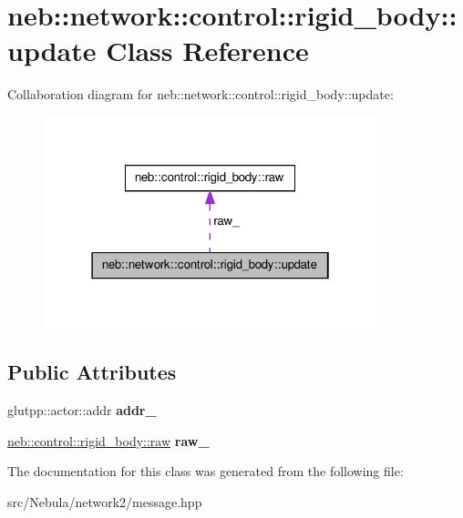 \hypertarget{classneb_1_1network_1_1control_1_1rigid__body_1_1update}{\section{neb\-:\-:network\-:\-:control\-:\-:rigid\-\_\-body\-:\-:update \-Class \-Reference}
\label{classneb_1_1network_1_1control_1_1rigid__body_1_1update}
}


\-Collaboration diagram for neb\-:\-:network\-:\-:control\-:\-:rigid\-\_\-body\-:\-:update\-:\nopagebreak
\begin{figure}[H]
\begin{center}
\leavevmode
\includegraphics[width=274pt]{classneb_1_1network_1_1control_1_1rigid__body_1_1update__coll__graph}
\end{center}
\end{figure}
\subsection*{\-Public \-Attributes}
\begin{DoxyCompactItemize}
\item 
\hypertarget{classneb_1_1network_1_1control_1_1rigid__body_1_1update_a945c51bfd8b694ba44fe0cd746599be8}{glutpp\-::actor\-::addr {\bfseries addr\-\_\-}}\label{classneb_1_1network_1_1control_1_1rigid__body_1_1update_a945c51bfd8b694ba44fe0cd746599be8}

\item 
\hypertarget{classneb_1_1network_1_1control_1_1rigid__body_1_1update_a8d98e10494784b8e30fef30a640d1b8c}{\hyperlink{classneb_1_1control_1_1rigid__body_1_1raw}{neb\-::control\-::rigid\-\_\-body\-::raw} {\bfseries raw\-\_\-}}\label{classneb_1_1network_1_1control_1_1rigid__body_1_1update_a8d98e10494784b8e30fef30a640d1b8c}

\end{DoxyCompactItemize}


\-The documentation for this class was generated from the following file\-:\begin{DoxyCompactItemize}
\item 
src/\-Nebula/network2/message.\-hpp\end{DoxyCompactItemize}
